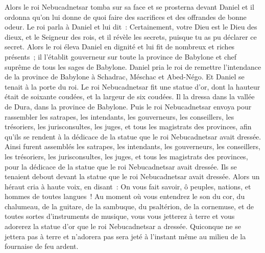 \begin{multicols}{2}
Alors le roi Nebucadnetsar tomba sur sa face et se prosterna devant Daniel et il ordonna qu'on lui donne de quoi faire des sacrifices et des offrandes de bonne odeur.
Le roi parla à Daniel et lui dit~: Certainement, votre Dieu est le Dieu des dieux, et le Seigneur des rois, et il révèle les secrets, puisque tu as pu déclarer ce secret.
Alors le roi éleva Daniel en dignité et lui fit de nombreux et riches présents~; il l'établit gouverneur sur toute la province de Babylone et chef suprême de tous les sages de Babylone.
Daniel pria le roi de remettre l'intendance de la province de Babylone à Schadrac, Méschac et Abed-Négo. Et Daniel se tenait à la porte du roi.
\VerseOne{}Le roi Nebucadnetsar fit une statue d'or, dont la hauteur était de soixante coudées, et la largeur de six coudées. Il la dressa dans la vallée de Dura, dans la province de Babylone.
Puis le roi Nebucadnetsar envoya pour rassembler les satrapes, les intendants, les gouverneurs, les conseillers, les trésoriers, les jurisconsultes, les juges, et tous les magistrats des provinces, afin qu'ils se rendent à la dédicace de la statue que le roi Nebucadnetsar avait dressée.
Ainsi furent assemblés les satrapes, les intendants, les gouverneurs, les conseillers, les trésoriers, les jurisconsultes, les juges, et tous les magistrats des provinces, pour la dédicace de la statue que le roi Nebucadnetsar avait dressée. Ils se tenaient debout devant la statue que le roi Nebucadnetsar avait dressée.
Alors un héraut cria à haute voix, en disant~: On vous fait savoir, ô peuples, nations, et hommes de toutes langues~!
Au moment où vous entendrez le son du cor, du chalumeau, de la guitare, de la sambuque, du psaltérion, de la cornemuse, et de toutes sortes d'instruments de musique, vous vous jetterez à terre et vous adorerez la statue d'or que le roi Nebucadnetsar a dressée.
Quiconque ne se jettera pas à terre et n'adorera pas sera jeté à l'instant même au milieu de la fournaise de feu ardent.

\end{multicols}
